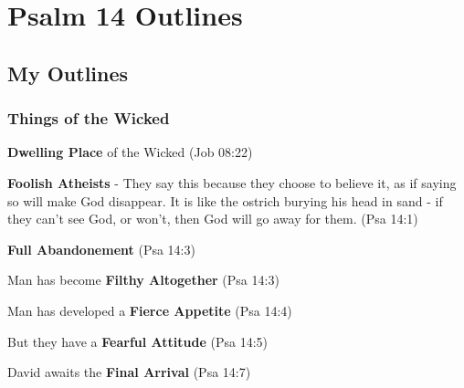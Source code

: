 \section{Psalm 14 Outlines}

\subsection{My Outlines}

\subsubsection{Things of the Wicked}
\begin{compactenum}[I.][7]
    \item \textbf{Dwelling Place} of the Wicked (Job 08:22) 
	\item\textbf{Foolish Atheists} - They say this because they choose to believe it, as if saying so will make God disappear. It is like the ostrich burying his head in sand - if they can't see God, or won't, then God will go away for them. (Psa 14:1) 
	\item  \textbf{Full Abandonement}  (Psa 14:3)
	\item Man has become \textbf{Filthy Altogether} (Psa 14:3)
	\item Man has developed a \textbf{Fierce Appetite} (Psa 14:4)
	\item But they have a \textbf{Fearful Attitude} (Psa 14:5)
    \item David awaits the \textbf{Final Arrival} (Psa 14:7)
\end{compactenum}

